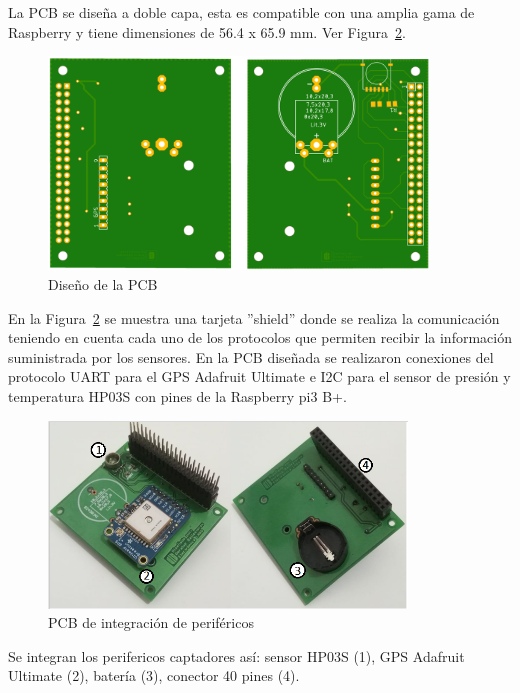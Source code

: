 La PCB se diseña a doble capa, esta es compatible con una amplia gama de Raspberry y tiene dimensiones de 56.4 x 65.9 mm.
Ver Figura~\ref{pcb}.

\begin{figure}[H]
\includegraphics[width=0.90\textwidth]{Figs/pcb_eagle.PNG} 
\centering
\caption{Diseño de la PCB}
\label{pcb}
\end{figure}

En la Figura~\ref{pcb} se muestra una tarjeta ''shield'' donde se realiza la comunicación teniendo en cuenta cada uno de los protocolos que permiten recibir la información suministrada por los sensores.
En la PCB diseñada se realizaron conexiones del protocolo UART para el GPS Adafruit Ultimate e I2C para el sensor de presión y temperatura HP03S con pines de la Raspberry pi3 B+. 

\begin{figure}[H]
\includegraphics[width=0.85\textwidth]{Figs/pcb.PNG} 
\centering
\caption{PCB de integración de periféricos}
\label{pcb}
\end{figure}

Se integran los perifericos captadores así: sensor HP03S (1), GPS Adafruit Ultimate (2), batería (3), conector 40 pines (4).

